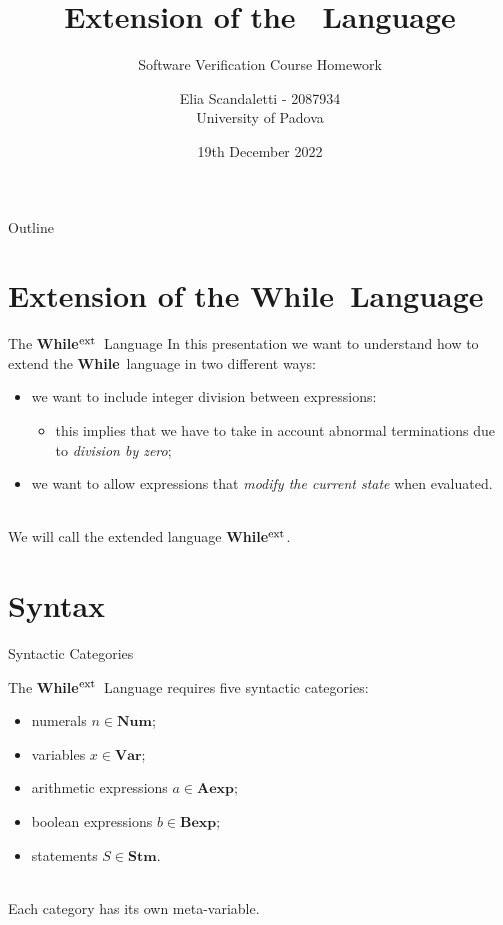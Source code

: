 \documentclass{beamer}
\title{Extension of the \While\ Language}
\subtitle{Software Verification Course Homework}
\author[E. Scandaletti]{Elia Scandaletti\texorpdfstring{ - 2087934\\University of Padova}{}}
\date[19/12/2022]{19th December 2022}
\newcommand{\While}{\textbf{While}}
\newcommand{\ExtWhile}{\textbf{While}\ensuremath{^{\mbox{\footnotesize ext}}}}
\newcommand{\Num}{\textbf{Num}}
\newcommand{\Var}{\textbf{Var}}
\newcommand{\Aexp}{\textbf{Aexp}}
\newcommand{\Bexp}{\textbf{Bexp}}
\newcommand{\Stm}{\textbf{Stm}}
\begin{document}
\begin{frame}
    \titlepage
\end{frame}

\begin{frame}{Outline}
    \tableofcontents
\end{frame}

\section{Extension of the \While\ Language}

\begin{frame}{The \ExtWhile\ Language}
    In this presentation we want to understand how to extend the \While\ language in two different ways:
    \begin{itemize}
        \item we want to include integer division between expressions:
              \begin{itemize}
                  \item this implies that we have to take in account abnormal terminations due to \emph{division by zero};
              \end{itemize}
        \item we want to allow expressions that \emph{modify the current state} when evaluated.
    \end{itemize}

    ~\\
    We will call the extended language \ExtWhile.

\end{frame}

\section{Syntax}

\begin{frame}{Syntactic Categories}

    The \ExtWhile\ Language requires five syntactic categories:
    \begin{itemize}
        \item numerals $n \in \Num$;
        \item variables $x \in \Var$;
        \item arithmetic expressions $a \in \Aexp$;
        \item boolean expressions $b \in \Bexp$;
        \item statements $S \in \Stm$.
    \end{itemize}

    ~\\
    Each category has its own meta-variable.

\end{frame}
\end{document}
